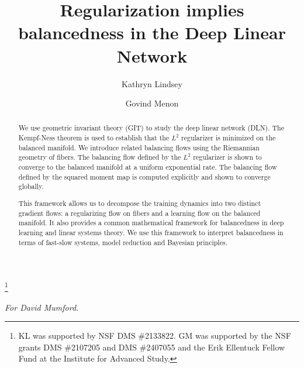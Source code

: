 \documentclass[reqno]{amsart}
\begin{document}


\title{Regularization implies balancedness in the Deep Linear Network}


\begin{abstract}
We use geometric invariant theory (GIT) to study the deep linear network (DLN). The Kempf-Ness theorem is used to establish that the $L^2$ regularizer is minimized on the balanced manifold. We introduce related balancing flows using the Riemannian geometry of fibers. The balancing flow defined by the  $L^2$ regularizer is shown to converge to the balanced manifold at a uniform exponential rate. The balancing flow defined by the squared moment map is computed explicitly and shown to converge globally.

This framework allows us to decompose the training dynamics into two distinct gradient flows: a  regularizing flow on fibers and a learning flow on the balanced manifold. It also provides a common mathematical framework for balancedness in deep learning and linear systems theory. We use this framework to interpret balancedness in terms of fast-slow systems, model reduction and Bayesian principles. 

\end{abstract}

\author{Kathryn Lindsey}
\address{Department of Mathematics, Maloney Hall, Boston College, Chestnut Hill, MA 02467-3806}


\author{Govind Menon}
\address{Division of Applied Mathematics, Brown University, 182 George St., Providence, RI 02912.}



\thanks{KL was supported by NSF DMS \#2133822. GM 
was supported by the NSF grants DMS \#2107205 and DMS \#2407055 and the Erik Ellentuck Fellow Fund at the Institute for Advanced Study.}



\maketitle

{\centering \em For David Mumford. \par}



\maketitle








%
%
%
%



\end{document}
